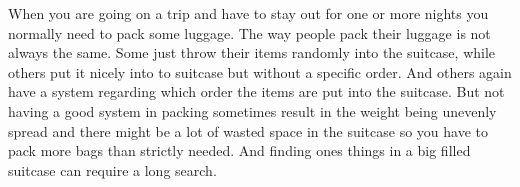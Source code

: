When you are going on a trip and have to stay out for one or more nights you normally need to pack some luggage. The way people pack their luggage is not always the same. Some just throw their items randomly into the suitcase, while others put it nicely into to suitcase but without a specific order. And others again have a system regarding which order the items are put into the suitcase. But not having a good system in packing sometimes result in the weight being unevenly spread and there might be a lot of wasted space in the suitcase so you have to pack more bags than strictly needed. And finding ones things in a big filled suitcase can require a long search.